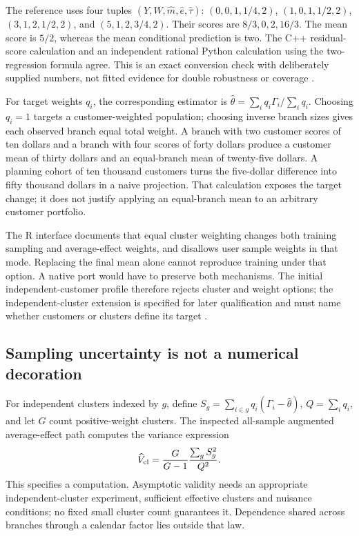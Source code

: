 The reference uses four tuples
\((Y,W,\widehat m,\widehat e,\widehat\tau)\): \((0,0,1,1/4,2)\),
\((1,0,1,1/2,2)\), \((3,1,2,1/2,2)\), and \((5,1,2,3/4,2)\). Their
scores are \(8/3,0,2,16/3\). The mean score is \(5/2\), whereas the mean
conditional prediction is two. The C++ residual-score calculation and an
independent rational Python calculation using the two-regression formula
agree. This is an exact conversion check with deliberately supplied
numbers, not fitted evidence for double robustness or coverage
\citep{exec13_grf_oracle}.

For target weights \(q_i\), the corresponding estimator is
\(\widehat\theta=\sum_iq_i\Gamma_i/\sum_iq_i\). Choosing \(q_i=1\)
targets a customer-weighted population; choosing inverse branch sizes
gives each observed branch equal total weight. A branch with two
customer scores of ten dollars and a branch with four scores of forty
dollars produce a customer mean of thirty dollars and an equal-branch
mean of twenty-five dollars. A planning cohort of ten thousand customers
turns the five-dollar difference into fifty thousand dollars in a naive
projection. That calculation exposes the target change; it does not
justify applying an equal-branch mean to an arbitrary customer
portfolio.

The R interface documents that equal cluster weighting changes both
training sampling and average-effect weights, and disallows user sample
weights in that mode. Replacing the final mean alone cannot reproduce
training under that option. A native port would have to preserve both
mechanisms. The initial independent-customer profile therefore rejects
cluster and weight options; the independent-cluster extension is
specified for later qualification and must name whether customers or
clusters define its target \citep{exec13_grf_rpath}.

\subsection{Sampling uncertainty is not a numerical decoration}

For independent clusters indexed by \(g\), define
\(S_g=\sum_{i\in g}q_i(\Gamma_i-\widehat\theta)\), \(Q=\sum_iq_i\), and
let \(G\) count positive-weight clusters. The inspected all-sample
augmented average-effect path computes the variance expression \[
 \widehat V_{\rm cl}=\frac{G}{G-1}\frac{\sum_g S_g^2}{Q^2}.
\] This specifies a computation. Asymptotic validity needs an
appropriate independent-cluster experiment, sufficient effective
clusters and nuisance conditions; no fixed small cluster count
guarantees it. Dependence shared across branches through a calendar
factor lies outside that law.

